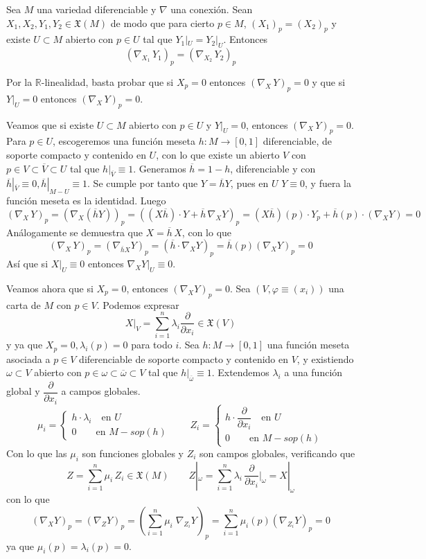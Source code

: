 \begin{teo}
Sea $M$ una variedad diferenciable y $\nabla$ una conexión. Sean $X_1,X_2,Y_1,Y_2 \in \mathfrak{X}(M)$ de modo que para cierto $p \in M$, $(X_1)_p = (X_2)_p$ y existe $U \subset M$ abierto con $p \in U$ tal que $Y_1|_U = Y_2|_U$. Entonces $$(\nabla_{X_1}\,Y_1)_p = (\nabla_{X_2}\,Y_2)_p$$
\end{teo}
\begin{dem}
Por la $\mathbb{R}$-linealidad, basta probar que si $X_p = 0$ entonces $(\nabla_X\,Y)_p = 0$ y que si $Y|_U = 0$ entonces $(\nabla_X\,Y)_p = 0$.

Veamos que si existe $U \subset M$ abierto con $p \in U$ y $Y|_U = 0$, entonces $(\nabla_X\,Y)_p = 0$. Para $p \in U$, escogeremos una función meseta $h:M\to [0,1]$ diferenciable, de soporte compacto y contenido en $U$, con lo que existe un abierto $V$ con $p \in V \subset \overline{V} \subset U$ tal que $h|_{\overline{V}} \equiv 1$. Generamos $\overline{h} = 1-h$, diferenciable y con $\overline{h}|_{\overline{V}} \equiv 0, \overline{h}|_{M-U} \equiv 1$. Se cumple por tanto que $Y = \overline{h} Y$, pues en $U$ $Y\equiv 0$, y fuera la función meseta es la identidad. Luego
$$(\nabla_X\,Y)_p = (\nabla_X(\overline{h}Y))_p = ((X\overline{h})\cdot Y + \overline{h}\,\nabla_X Y)_p = (X\overline{h})(p) \cdot Y_p + \overline{h}(p)\cdot (\nabla_X Y) = 0$$
Análogamente se demuestra que $X = \overline{h}\,X$, con lo que 
$$(\nabla_X\,Y)_p = (\nabla_{\overline{h}X} Y)_p = (\overline{h}\cdot\nabla_X Y)_p = \overline{h}(p)(\nabla_X Y)_p = 0$$
Así que si $X|_U \equiv 0$ entonces $\nabla_X Y|_U \equiv 0$.

Veamos ahora que si $X_p = 0$, entonces $(\nabla_X Y)_p = 0$. Sea $(V,\varphi\equiv (x_i))$ una carta de $M$ con $p \in V$. Podemos expresar
$$X|_V = \sum_{i=1}^n \lambda_i \dfrac{\partial}{\partial x_i} \in \mathfrak{X}(V)$$
y ya que $X_p = 0, \lambda_i(p) = 0$ para todo $i$. Sea $h:M \to [0,1]$ una función meseta asociada a $p\in V$ diferenciable de soporte compacto y contenido en $V$, y existiendo $\omega \subset V$ abierto con $p \in \omega \subset \overline{\omega} \subset V$ tal que $h|_{\overline{\omega}} \equiv 1$.
Extendemos $\lambda_i$ a una función global y $\dfrac{\partial}{\partial x_i}$ a campos globales.
$$\mu_i = \begin{cases}
h\cdot \lambda_i \quad \text{en } U\\
0 \qquad \text{en } M-sop(h)
\end{cases} \qquad Z_i = \begin{cases}
h \cdot \dfrac{\partial}{\partial x_i}  \quad \text{en } U\\
0 \qquad \text{en } M-sop(h)
\end{cases}$$
Con lo que las $\mu_i$ son funciones globales y $Z_i$ son campos globales, verificando que $$Z = \sum_{i=1}^n \mu_i \,Z_i \in \mathfrak{X}(M) \qquad Z|_\omega = \sum_{i=1}^n \lambda_i \,\dfrac{\partial}{\partial x_i}\Big|_\omega = X|_\omega$$
con lo que $$(\nabla_X Y)_p = (\nabla_Z Y)_p = \left(\sum_{i=1}^n \mu_i \;\nabla_{Z_i} Y\right)_p = \sum_{i=1}^n \mu_i(p) (\nabla_{Z_i} Y)_p = 0$$
ya que $\mu_i(p) = \lambda_i(p) = 0$.
\end{dem}
